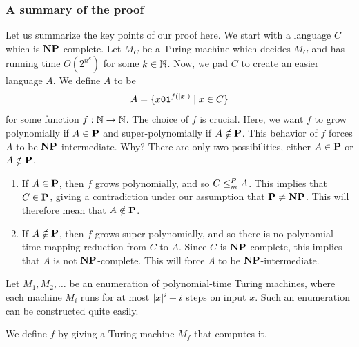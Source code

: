 \documentclass[11pt,twoside=off,numbers=noenddot]{scrbook}
\begin{document}
\subsubsection{A summary of the proof}
Let us summarize the key points of our proof here. We start with a language $C$ which is $\textbf{NP}$-complete. Let $M_C$ be a Turing machine which decides $M_C$ and has running time $O(2^{n^k})$ for some $k \in \mathbb N$. Now, we pad $C$ to create an easier language $A$. We define $A$ to be
\[ A = \{ x\texttt{0}\texttt{1}^{f(| x |)} \mid x \in C \} \]
for some function $f : \mathbb N \to \mathbb N$. The choice of $f$ is crucial. Here, we want $f$ to grow polynomially if $A \in \textbf{P}$ and super-polynomially if $A \notin \textbf{P}$. This behavior of $f$ forces $A$ to be $\textbf{NP}$-intermediate. Why? There are only two possibilities, either $A \in \textbf{P}$ or $A \notin \textbf{P}$.
\begin{enumerate}
  \item If $A \in \textbf{P}$, then $f$ grows polynomially, and so $C \leq_m^P A$. This implies that $C \in \textbf{P}$, giving a contradiction under our assumption that $\textbf{P} \neq \textbf{NP}$. This will therefore mean that $A \notin \textbf{P}$.
  \item If $A \notin \textbf{P}$, then $f$ grows super-polynomially, and so there is no polynomial-time mapping reduction from $C$ to $A$. Since $C$ is $\textbf{NP}$-complete, this implies that $A$ is not $\textbf{NP}$-complete. This will force $A$ to be $\textbf{NP}$-intermediate.
\end{enumerate}
Let $M_1, M_2, \dots$ be an enumeration of polynomial-time Turing machines, where each machine $M_i$ runs for at most $| x |^i + i$ steps on input $x$. Such an enumeration can be constructed quite easily.

We define $f$ by giving a Turing machine $M_f$ that computes it.
\end{document}

